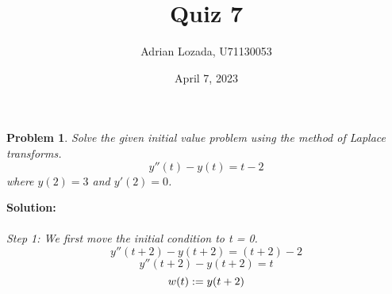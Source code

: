 \documentclass{article}
\title{Quiz 7}
\author{Adrian Lozada, U71130053}
\date{April 7, 2023}
\newtheorem{problem}{Problem}
\begin{document}
    \maketitle
    \newpage

    \begin{problem}
        Solve the given initial value problem using the method of Laplace transforms.
        \[y''(t) - y(t) = t - 2\] where $y(2) = 3$ and $y'(2) = 0$. \\
    \end{problem}
    \textbf{Solution:} \\ \\ 
    \textit{Step 1: We first move the initial condition to t = 0.} \\
    $$y''(t + 2) - y(t + 2) = (t + 2) - 2$$
    $$y''(t + 2) - y(t + 2) = t$$
     $$w(t) := y(t + 2) \\$$
     
\end{document}
